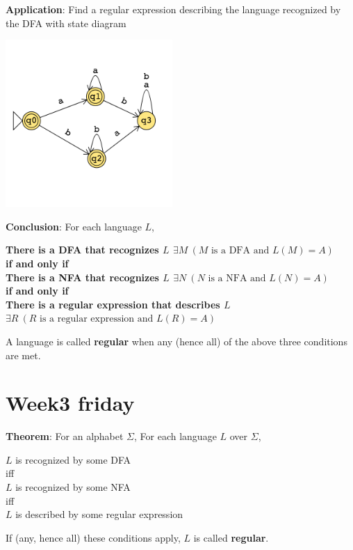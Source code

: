 \documentclass[12pt, oneside]{article}
\begin{document}
{\bf Application}: Find a regular expression describing the language recognized by the DFA with 
state diagram

\includegraphics[width=2.5in]{resources/machines/Lect6NFA3.png}

\vfill


\newpage

{\bf Conclusion}: For each language $L$,
\begin{center}
    {\bf There is a DFA that recognizes $L$ \qquad $\exists M ~(M \textrm{ is a DFA and } L(M) = A)$}\\
    {\bf if and only if}\\
    {\bf There is a NFA that recognizes $L$  \qquad $\exists N ~(N \textrm{ is a NFA and } L(N) = A)$}\\
    {\bf if and only if}\\
    {\bf There is a regular expression that describes $L$ $\exists R ~(R \textrm{ is a regular expression and } L(R) = A)$}\\
\end{center}

A language is called {\bf regular} when any (hence all) of the above three conditions are met. \vfill
\section*{Week3 friday}



{\bf Theorem}: For an alphabet $\Sigma$, For each language $L$ over $\Sigma$, 
\begin{center}
$L$ is recognized by some DFA \\
iff\\
$L$ is recognized by some NFA\\
iff\\
$L$ is described by some regular expression
\end{center}
If (any, hence all) these conditions apply, $L$ is called {\bf regular}.
\end{document}
